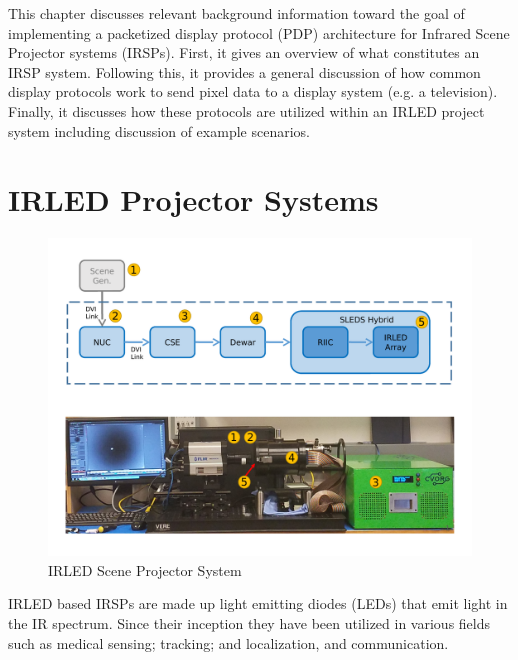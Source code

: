\label{chap:background}

    This chapter discusses relevant background information toward the goal of implementing a packetized display protocol (PDP) architecture for Infrared Scene Projector systems (IRSPs). First, it gives an overview of what constitutes an IRSP system. Following this, it provides a general discussion of how common display protocols work to send pixel data to a display system (e.g. a television). Finally, it discusses how these protocols are utilized within an IRLED project system including discussion of example scenarios.

\section{IRLED Projector Systems}

    \begin{figure}
        \centering
        \includegraphics[width=1.0\textwidth]{fig/sleds_system.pdf}
        \caption{IRLED Scene Projector System}
        \label{fig:sleds_system}
    \end{figure}

    IRLED based IRSPs are made up light emitting diodes (LEDs) that emit light in the IR spectrum\cite{biard1966semiconductor}. Since their inception they have been utilized in various fields such as medical\cite{MonteiroEtAl2011,MEEKS1998433,Sadick2009,takhtfooladi2015effects,yamanishi1995respiration} sensing; tracking; and localization\cite{PlotogVladescu2015,Kimon2001,SCHOLZ20151233,WalshDaemsSteckel2015,zeylikovich2003mid}, and communication\cite{CossuEtAl2014,escobosa2004ir,GeorgopoulosKormakopoulos1986,sohn2007localization,JangEtAl2012}.

